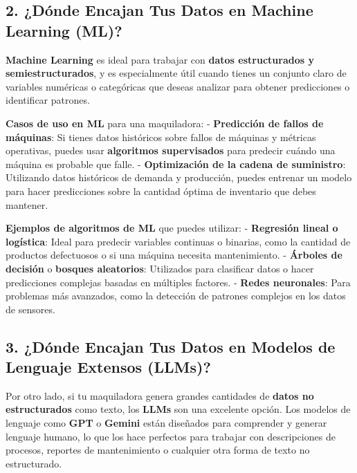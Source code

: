 \documentclass[
  10pt,
  letterpaper,
]{book}
\begin{document}
\subsection{\texorpdfstring{2. \textbf{¿Dónde Encajan Tus Datos en
Machine Learning
(ML)?}}{2. ¿Dónde Encajan Tus Datos en Machine Learning (ML)?}}\label{duxf3nde-encajan-tus-datos-en-machine-learning-ml}

\textbf{Machine Learning} es ideal para trabajar con \textbf{datos
estructurados y semiestructurados}, y es especialmente útil cuando
tienes un conjunto claro de variables numéricas o categóricas que deseas
analizar para obtener predicciones o identificar patrones.

\textbf{Casos de uso en ML} para una maquiladora: - \textbf{Predicción
de fallos de máquinas}: Si tienes datos históricos sobre fallos de
máquinas y métricas operativas, puedes usar \textbf{algoritmos
supervisados} para predecir cuándo una máquina es probable que falle. -
\textbf{Optimización de la cadena de suministro}: Utilizando datos
históricos de demanda y producción, puedes entrenar un modelo para hacer
predicciones sobre la cantidad óptima de inventario que debes mantener.

\textbf{Ejemplos de algoritmos de ML} que puedes utilizar: -
\textbf{Regresión lineal o logística}: Ideal para predecir variables
continuas o binarias, como la cantidad de productos defectuosos o si una
máquina necesita mantenimiento. - \textbf{Árboles de decisión} o
\textbf{bosques aleatorios}: Utilizados para clasificar datos o hacer
predicciones complejas basadas en múltiples factores. - \textbf{Redes
neuronales}: Para problemas más avanzados, como la detección de patrones
complejos en los datos de sensores.

\subsection{\texorpdfstring{3. \textbf{¿Dónde Encajan Tus Datos en
Modelos de Lenguaje Extensos
(LLMs)?}}{3. ¿Dónde Encajan Tus Datos en Modelos de Lenguaje Extensos (LLMs)?}}\label{duxf3nde-encajan-tus-datos-en-modelos-de-lenguaje-extensos-llms}

Por otro lado, si tu maquiladora genera grandes cantidades de
\textbf{datos no estructurados} como texto, los \textbf{LLMs} son una
excelente opción. Los modelos de lenguaje como \textbf{GPT} o
\textbf{Gemini} están diseñados para comprender y generar lenguaje
humano, lo que los hace perfectos para trabajar con descripciones de
procesos, reportes de mantenimiento o cualquier otra forma de texto no
estructurado.
\end{document}
